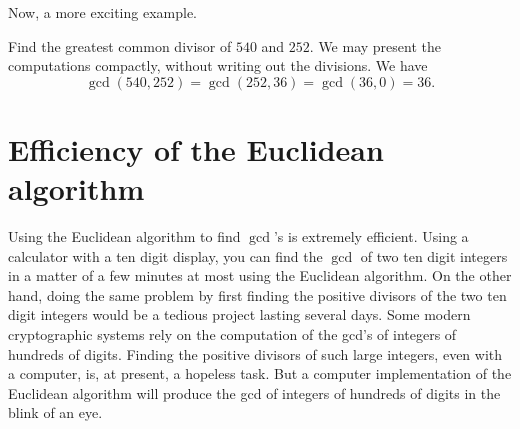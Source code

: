Now, a more exciting example.
\begin{exmp}
Find the greatest common divisor of $540$ and $252$. We may present the computations compactly,
without writing out the divisions. 
We have
\[\gcd(540,252)=\gcd(252,36)=\gcd(36,0) = 36.
\]
\end{exmp}


\section{Efficiency of the Euclidean algorithm}
Using the Euclidean algorithm to find $\gcd$'s is extremely efficient. Using a calculator
with a ten digit display, you can find the $\gcd$ of two ten digit integers in a matter of a few
minutes at most using the Euclidean algorithm. On the other hand, doing the same problem
by first finding the positive divisors of the two ten digit integers would be a tedious
project lasting several days. Some modern cryptographic systems rely on the computation
of the gcd's of integers of hundreds of digits. Finding the positive divisors of such
large integers, even with a computer, is, at present, a hopeless task. But a computer
 implementation of
the  Euclidean  algorithm will produce the gcd of integers of hundreds of digits in the blink
of an eye. 




